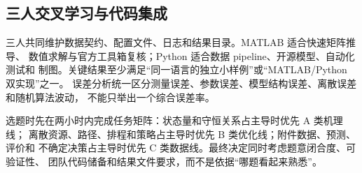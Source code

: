 \subsection{三人交叉学习与代码集成}

三人共同维护数据契约、配置文件、日志和结果目录。MATLAB 适合快速矩阵推导、
数值求解与官方工具箱复核；Python 适合数据 pipeline、开源模型、自动化测试和
制图。关键结果至少满足“同一语言的独立小样例”或“MATLAB/Python 双实现”之一。
误差分析统一区分测量误差、参数误差、模型结构误差、离散误差和随机算法波动，
不能只举出一个综合误差率。

选题时先在两小时内完成任务矩阵：状态量和守恒关系占主导时优先 A 类机理线；
离散资源、路径、排程和策略占主导时优先 B 类优化线；附件数据、预测、评价和
不确定决策占主导时优先 C 类数据线。最终决定同时考虑题意闭合度、可验证性、
团队代码储备和结果文件要求，而不是依据“哪题看起来熟悉”。

